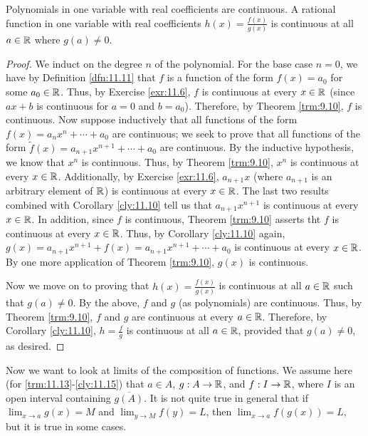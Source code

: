 \documentclass[../main.tex]{subfiles}
\begin{document}
\begin{corollary}\label{cly:11.12}
    Polynomials in one variable with real coefficients are continuous. A rational function in one variable with real coefficients $h(x)=\frac{f(x)}{g(x)}$ is continuous at all $a\in\mathbb{R}$ where $g(a)\neq 0$.
    \begin{proof}
        We induct on the degree $n$ of the polynomial. For the base case $n=0$, we have by Definition \ref{dfn:11.11} that $f$ is a function of the form $f(x)=a_0$ for some $a_0\in\mathbb{R}$. Thus, by Exercise \ref{exr:11.6}, $f$ is continuous at every $x\in\mathbb{R}$ (since $ax+b$ is continuous for $a=0$ and $b=a_0$). Therefore, by Theorem \ref{trm:9.10}, $f$ is continuous. Now suppose inductively that all functions of the form $f(x)=a_nx^n+\cdots+a_0$ are continuous; we seek to prove that all functions of the form $\tilde{f}(x)=a_{n+1}x^{n+1}+\cdots+a_0$ are continuous. By the inductive hypothesis, we know that $x^n$ is continuous. Thus, by Theorem \ref{trm:9.10}, $x^n$ is continuous at every $x\in\mathbb{R}$. Additionally, by Exercise \ref{exr:11.6}, $a_{n+1}x$ (where $a_{n+1}$ is an arbitrary element of $\mathbb{R}$) is continuous at every $x\in\mathbb{R}$. The last two results combined with Corollary \ref{cly:11.10} tell us that $a_{n+1}x^{n+1}$ is continuous at every $x\in\mathbb{R}$. In addition, since $f$ is continuous, Theorem \ref{trm:9.10} asserts tht $f$ is continuous at every $x\in\mathbb{R}$. Thus, by Corollary \ref{cly:11.10} again, $g(x)=a_{n+1}x^{n+1}+f(x)=a_{n+1}x^{n+1}+\cdots+a_0$ is continuous at every $x\in\mathbb{R}$. By one more application of Theorem \ref{trm:9.10}, $g(x)$ is continuous.\par
        Now we move on to proving that $h(x)=\frac{f(x)}{g(x)}$ is continuous at all $a\in\mathbb{R}$ such that $g(a)\neq 0$. By the above, $f$ and $g$ (as polynomials) are continuous. Thus, by Theorem \ref{trm:9.10}, $f$ and $g$ are continuous at every $a\in\mathbb{R}$. Therefore, by Corollary \ref{cly:11.10}, $h=\frac{f}{g}$ is continuous at all $a\in\mathbb{R}$, provided that $g(a)\neq 0$, as desired.
    \end{proof}
\end{corollary}

Now we want to look at limits of the composition of functions. We assume here (for \ref{trm:11.13}-\ref{cly:11.15}) that $a\in A$, $g:A\to\mathbb{R}$, and $f:I\to\mathbb{R}$, where $I$ is an open interval containing $\overline{g(A)}$. It is not quite true in general that if $\lim_{x\to a}g(x)=M$ and $\lim_{y\to M}f(y)=L$, then $\lim_{x\to a}f(g(x))=L$, but it is true in some cases.
\end{document}
